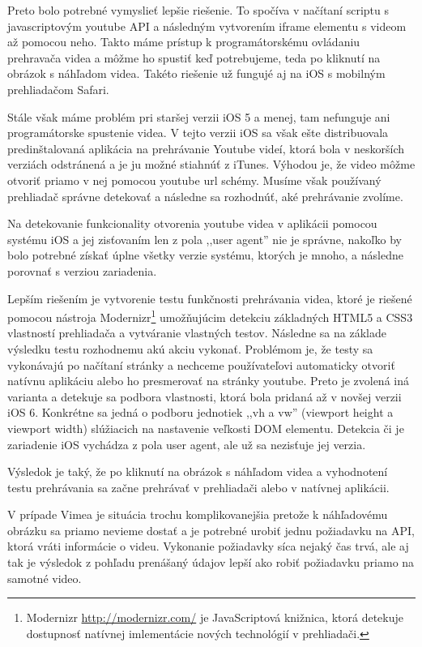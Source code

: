 Preto bolo potrebné vymyslieť lepšie riešenie. To spočíva v načítaní scriptu s javascriptovým youtube API a následným vytvorením iframe elementu s videom až pomocou neho. Takto máme prístup k programátorskému ovládaniu prehravača videa a môžme ho spustiť keď potrebujeme, teda po kliknutí na obrázok s náhľadom videa. Takéto riešenie už fungujé aj na iOS s mobilným prehliadačom Safari.

Stále však máme problém pri staršej verzii iOS 5 a menej, tam nefunguje ani programátorske spustenie videa. V tejto verzii iOS sa však ešte distribuovala predinštalovaná aplikácia na prehrávanie Youtube videí, ktorá bola v neskorších verziách odstránená a je ju možné stiahnúť z iTunes. Výhodou je, že video môžme otvoriť priamo v nej pomocou youtube url schémy. Musíme však používaný prehliadač správne detekovať a následne sa rozhodnúť, aké prehrávanie zvolíme.

Na detekovanie funkcionality otvorenia youtube videa v aplikácii pomocou systému iOS a jej zisťovaním len z pola ,,user agent'' nie je správne, nakoľko by bolo potrebné získať úplne všetky verzie systému, ktorých je mnoho, a následne porovnať s verziou zariadenia.

Lepším riešením je vytvorenie testu funkčnosti prehrávania videa, ktoré je riešené pomocou nástroja Modernizr\footnote{Modernizr \url{http://modernizr.com/} je JavaScriptová knižnica, ktorá detekuje dostupnosť natívnej imlementácie nových technológií v prehliadači.} umožňujúcim detekciu základných HTML5 a CSS3 vlastností prehliadača a vytváranie vlastných testov. Následne sa na základe výsledku testu rozhodnemu akú akciu vykonať. Problémom je, že testy sa vykonávajú po načítaní stránky a nechceme používateľovi automaticky otvoriť natívnu aplikáciu alebo ho presmerovať na stránky youtube. Preto je zvolená iná varianta a detekuje sa podbora vlastnosti, ktorá bola pridaná až v novšej verzii iOS 6. Konkrétne sa jedná o podboru jednotiek ,,vh a vw'' (viewport height a viewport width) slúžiacich na nastavenie veľkosti DOM elementu. Detekcia či je zariadenie iOS vychádza z pola user agent, ale už sa nezisťuje jej verzia.

Výsledok je taký, že po kliknutí na obrázok s náhľadom videa a vyhodnotení testu prehrávania sa začne prehrávať v prehliadači alebo v natívnej aplikácii.

V prípade Vimea je situácia trochu komplikovanejšia pretože k náhľadovému obrázku sa priamo nevieme dostať a je potrebné urobiť jednu požiadavku na API, ktorá vráti informácie o videu. Vykonanie požiadavky síca nejaký čas trvá, ale aj tak je výsledok z pohľadu prenášaný údajov lepší ako robiť požiadavku priamo na samotné video.


